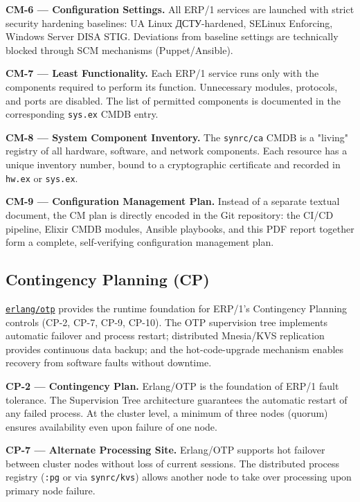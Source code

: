 \documentclass{article}
\begin{document}
\textbf{CM-6 --- Configuration Settings.}
All ERP/1 services are launched with strict security hardening baselines: UA Linux \foreignlanguage{ukrainian}{\foreignlanguage{ukrainian}{ДСТУ}-hardened}, SELinux Enforcing, Windows Server DISA STIG. Deviations from baseline settings are technically blocked through SCM mechanisms (Puppet/Ansible).

\textbf{CM-7 --- Least Functionality.}
Each ERP/1 service runs only with the components required to perform its function. Unnecessary modules, protocols, and ports are disabled. The list of permitted components is documented in the corresponding \texttt{sys.ex} CMDB entry.

\textbf{CM-8 --- System Component Inventory.}
The \texttt{synrc/ca} CMDB is a "living" registry of all hardware, software, and network components. Each resource has a unique inventory number, bound to a cryptographic certificate and recorded in \texttt{hw.ex} or \texttt{sys.ex}.

\textbf{CM-9 --- Configuration Management Plan.}
Instead of a separate textual document, the CM plan is directly encoded in the Git repository: the CI/CD pipeline, Elixir CMDB modules, Ansible playbooks, and this PDF report together form a complete, self-verifying configuration management plan.

\subsection{Contingency Planning (CP)}

\href{https://github.com/erlang/otp}{\texttt{erlang/otp}} provides the runtime foundation for ERP/1's Contingency Planning controls (CP-2, CP-7, CP-9, CP-10). The OTP supervision tree implements automatic failover and process restart; distributed Mnesia/KVS replication provides continuous data backup; and the hot-code-upgrade mechanism enables recovery from software faults without downtime.

\textbf{CP-2 --- Contingency Plan.}
Erlang/OTP is the foundation of ERP/1 fault tolerance. The Supervision Tree architecture guarantees the automatic restart of any failed process. At the cluster level, a minimum of three nodes (quorum) ensures availability even upon failure of one node.

\textbf{CP-7 --- Alternate Processing Site.}
Erlang/OTP supports hot failover between cluster nodes without loss of current sessions. The distributed process registry (\texttt{:pg} or via \texttt{synrc/kvs}) allows another node to take over processing upon primary node failure.
\end{document}
